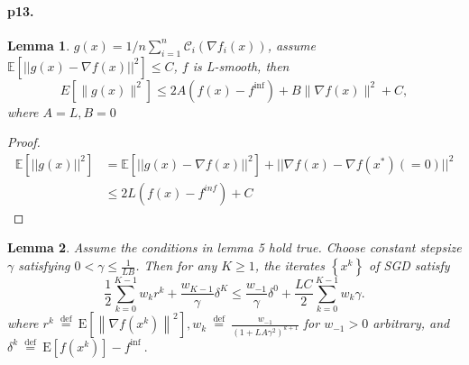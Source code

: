 \documentclass[8pt,a4paper]{article}
\newtheorem{lemma}{Lemma}
\newcommand{\E}{\mathbb{E}}
\begin{document}
	\paragraph{p13.}
	\begin{lemma}
	 $g(x)=1/n\sum_{i=1}^n \mathcal{C}_i(\nabla f_i(x))$, assume $\E[||g(x)-\nabla f(x)||^2]\leq C$, $f$ is L-smooth,
		then
		\begin{equation}
			E\left[\|g(x)\|^{2}\right] \leq 2 A\left(f(x)-f^{\mathrm{inf}}\right)+B\|\nabla f(x)\|^{2}+C,
		\end{equation}
	where $A=L,B=0$ 
	\end{lemma}
\begin{proof}
	\begin{equation*}
		\begin{aligned}
		\E[||g(x)||^2]&=\E[||g(x)-\nabla f(x)||^2]+||\nabla f(x)-\nabla f(x^*)(=0)||^2\\
		&\leq 2L(f(x)-f^{inf})+C
	\end{aligned}	
\end{equation*}
\end{proof}
\begin{lemma}
	Assume the conditions in lemma 5 hold true. Choose constant stepsize $\gamma$ satisfying $0<\gamma \leq \frac{1}{L B}$. Then for any $K \geq 1$, the iterates $\left\{x^{k}\right\}$ of SGD satisfy
	$$
	\frac{1}{2} \sum_{k=0}^{K-1} w_{k} r^{k}+\frac{w_{K-1}}{\gamma} \delta^{K} \leq \frac{w_{-1}}{\gamma} \delta^{0}+\frac{L C}{2} \sum_{k=0}^{K-1} w_{k} \gamma .
	$$
	where $r^{k} \stackrel{\text { def }}{=} \mathrm{E}\left[\left\|\nabla f\left(x^{k}\right)\right\|^{2}\right], w_{k} \stackrel{\text { def }}{=} \frac{w_{-1}}{\left(1+L A \gamma^{2}\right)^{k+1}}$ for $w_{-1}>0$ arbitrary, and $\delta^{k} \stackrel{\text { def }}{=} \mathrm{E}\left[f\left(x^{k}\right)\right]-f^{\text {inf }} .$
\end{lemma}
\end{document}
